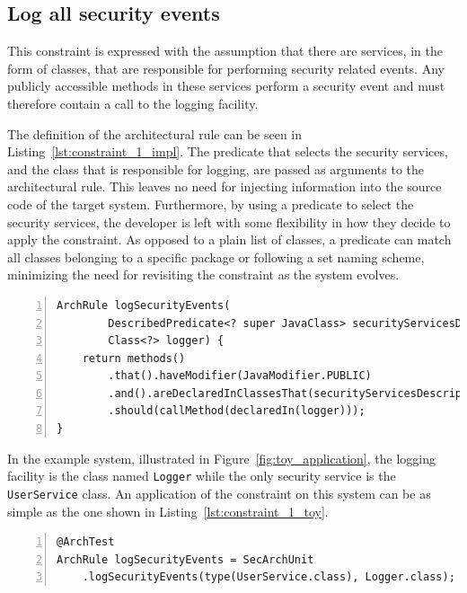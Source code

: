 
\subsection{Log all security events}
This constraint is expressed with the assumption that there are services, in the form of classes, that are responsible for performing security related events. Any publicly accessible methods in these services perform a security event and must therefore contain a call to the logging facility.

The definition of the architectural rule can be seen in Listing~\ref{lst:constraint_1_impl}. The predicate that selects the security services, and the class that is responsible for logging, are passed as arguments to the architectural rule. This leaves no need for injecting information into the source code of the target system. Furthermore, by using a predicate to select the security services, the developer is left with some flexibility in how they decide to apply the constraint. As opposed to a plain list of classes, a predicate can match all classes belonging to a specific package or following a set naming scheme, minimizing the need for revisiting the constraint as the system evolves.

\begin{minipage}{\linewidth}
\begin{lstlisting}[caption={Rule definition for constraint 1.}, captionpos=b, label=lst:constraint_1_impl, numbers=left]
ArchRule logSecurityEvents(
        DescribedPredicate<? super JavaClass> securityServicesDescriptor,
        Class<?> logger) {
    return methods()
        .that().haveModifier(JavaModifier.PUBLIC)
        .and().areDeclaredInClassesThat(securityServicesDescriptor)
        .should(callMethod(declaredIn(logger)));
}
\end{lstlisting}
\end{minipage}

In the example system, illustrated in Figure~\ref{fig:toy_application}, the logging facility is the class named \texttt{Logger} while the only security service is the \texttt{UserService} class. An application of the constraint on this system can be as simple as the one shown in Listing~\ref{lst:constraint_1_toy}.

\begin{minipage}{\linewidth}
\begin{lstlisting}[caption={Application of constraint 1 to the example system.}, captionpos=b, label=lst:constraint_1_toy, numbers=left]
@ArchTest
ArchRule logSecurityEvents = SecArchUnit
    .logSecurityEvents(type(UserService.class), Logger.class);
\end{lstlisting}
\end{minipage}

